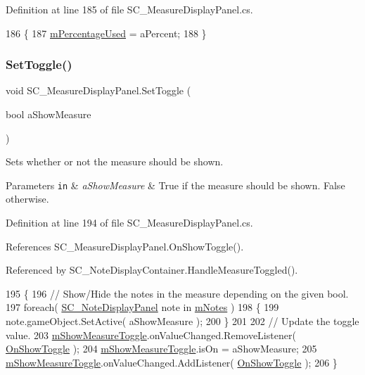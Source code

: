 Definition at line 185 of file S\+C\+\_\+\+Measure\+Display\+Panel.\+cs.


\begin{DoxyCode}
186     \{
187         \hyperlink{group___s_c___m_d_p_priv_var_ga7567e9001016a06d950b9d0cc9e1d905}{mPercentageUsed} = aPercent;
188     \}
\end{DoxyCode}
\mbox{\label{group___s_c___m_d_p_pub_func_ga6512fa5010bcecd85f7e8542cea91310}} 
\subsubsection{\texorpdfstring{Set\+Toggle()}{SetToggle()}}
{\footnotesize\ttfamily void S\+C\+\_\+\+Measure\+Display\+Panel.\+Set\+Toggle (\begin{DoxyParamCaption}\item[{bool}]{a\+Show\+Measure }\end{DoxyParamCaption})}



Sets whether or not the measure should be shown. 


\begin{DoxyParams}[1]{Parameters}
\mbox{\tt in}  & {\em a\+Show\+Measure} & True if the measure should be shown. False otherwise. \\
\hline
\end{DoxyParams}


Definition at line 194 of file S\+C\+\_\+\+Measure\+Display\+Panel.\+cs.



References S\+C\+\_\+\+Measure\+Display\+Panel.\+On\+Show\+Toggle().



Referenced by S\+C\+\_\+\+Note\+Display\+Container.\+Handle\+Measure\+Toggled().


\begin{DoxyCode}
195     \{
196         \textcolor{comment}{// Show/Hide the notes in the measure depending on the given bool.}
197         \textcolor{keywordflow}{foreach}( \hyperlink{class_s_c___note_display_panel}{SC\_NoteDisplayPanel} note \textcolor{keywordflow}{in} \hyperlink{group___s_c___m_d_p_priv_var_gaf8a533bce87e58d8f7a1da88f476ac6f}{mNotes} )
198         \{
199             note.gameObject.SetActive( aShowMeasure );
200         \}
201 
202         \textcolor{comment}{// Update the toggle value.}
203         \hyperlink{group___s_c___m_d_p_priv_var_gabec551ab0b79d269b028f4bc99e82b00}{mShowMeasureToggle}.onValueChanged.RemoveListener( 
      \hyperlink{group___s_c___m_d_p_handlers_ga31c72fee5ddd5ae7b057b2f265341263}{OnShowToggle} );
204         \hyperlink{group___s_c___m_d_p_priv_var_gabec551ab0b79d269b028f4bc99e82b00}{mShowMeasureToggle}.isOn = aShowMeasure;
205         \hyperlink{group___s_c___m_d_p_priv_var_gabec551ab0b79d269b028f4bc99e82b00}{mShowMeasureToggle}.onValueChanged.AddListener( 
      \hyperlink{group___s_c___m_d_p_handlers_ga31c72fee5ddd5ae7b057b2f265341263}{OnShowToggle} );
206     \}
\end{DoxyCode}
